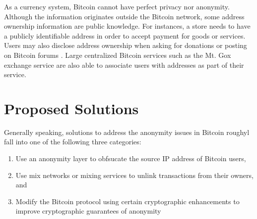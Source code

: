 As a currency system, Bitcoin cannot have perfect privacy nor anonymity. Although the information originates outside the Bitcoin network, some address ownership information are public knowledge. For instances, a store needs to have a publicly identifiable address in order to accept payment for goods or services. Users may also disclose address ownership when asking for donations or posting on Bitcoin forums \cite{Fistful12}. Large centralized Bitcoin services such as the Mt. Gox exchange service are also able to associate users with addresses as part of their service.



\cite{Androulaki12-privacy}


\section{Proposed Solutions}
Generally speaking, solutions to address the anonymity issues in Bitcoin roughyl fall into one of the following three categories:
\begin{enumerate}
	\item Use an anonymity layer to obfsucate the source IP address of Bitcoin users,
	\item Use mix networks or mixing services to unlink transactions from their owners, and
	\item Modify the Bitcoin protocol using certain cryptographic enhancements to improve cryptographic guarantees of anonymity
\end{enumerate}

